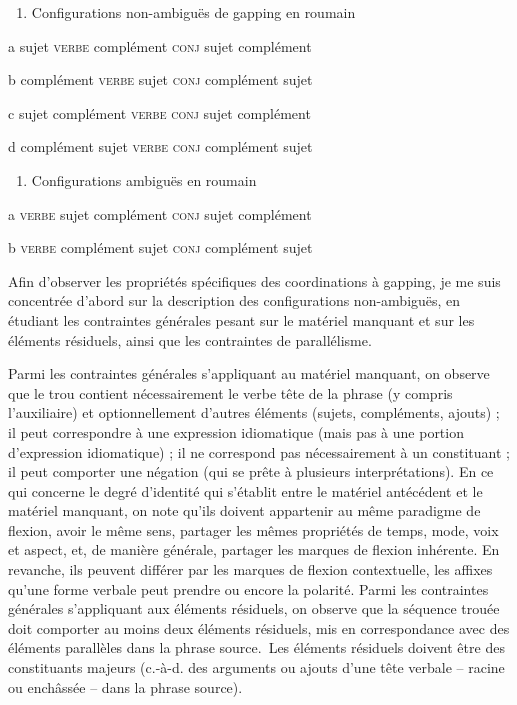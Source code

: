 \begin{enumerate}
\item   \label{bkm:Ref302409749}Configurations non-ambiguës de gapping en roumain 


\end{enumerate}
  a  sujet \textsc{verbe} complément \textsc{conj} sujet complément

  b  complément \textsc{verbe} sujet \textsc{conj} complément sujet

  c  sujet complément \textsc{verbe} \textsc{conj} sujet complément

  d  complément sujet \textsc{verbe} \textsc{conj} complément sujet


\begin{enumerate}
\item   \label{bkm:Ref302410068}Configurations ambiguës en roumain 


\end{enumerate}
  a  \textsc{verbe} sujet complément \textsc{conj} sujet complément

  b  \textsc{verbe} complément sujet \textsc{conj} complément sujet

Afin d'observer les propriétés spécifiques des coordinations à gapping, je me suis concentrée d'abord sur la description des configurations non-ambiguës, en étudiant les contraintes générales pesant sur le matériel manquant et sur les éléments résiduels, ainsi que les contraintes de parallélisme.

Parmi les contraintes générales s'appliquant au matériel manquant, on observe que le trou contient nécessairement le verbe tête de la phrase (y compris l'auxiliaire) et optionnellement d'autres éléments (sujets, compléments, ajouts) ; il peut correspondre à une expression idiomatique (mais pas à une portion d'expression idiomatique) ; il ne correspond pas nécessairement à un constituant ; il peut comporter une négation (qui se prête à plusieurs interprétations). En ce qui concerne le degré d'identité qui s'établit entre le matériel antécédent et le matériel manquant, on note qu'ils doivent appartenir au même paradigme de flexion, avoir le même sens, partager les mêmes propriétés de temps, mode, voix et aspect, et, de manière générale, partager les marques de flexion inhérente. En revanche, ils peuvent différer par les marques de flexion contextuelle, les affixes qu'une forme verbale peut prendre ou encore la polarité. Parmi les contraintes générales s'appliquant aux éléments résiduels, on observe que la séquence trouée doit comporter au moins deux éléments résiduels, mis en correspondance avec des éléments parallèles dans la phrase source.~Les éléments résiduels doivent être des constituants majeurs (c.-à-d. des arguments ou ajouts d'une tête verbale -- racine ou enchâssée -- dans la phrase source). 

